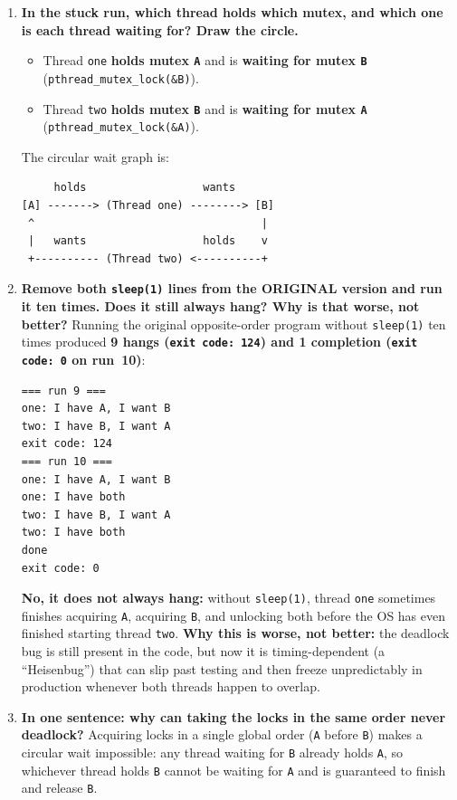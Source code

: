 \documentclass{../latex/utmreport}
\providecommand{\tightlist}{\setlength{\itemsep}{0pt}\setlength{\parskip}{0pt}}
\begin{document}
\begin{enumerate}
\tightlist
\item \textbf{In the stuck run, which thread holds which mutex, and which one is each thread waiting for? Draw the circle.}
\begin{itemize}
\tightlist
\item Thread \texttt{one} \textbf{holds mutex \texttt{A}} and is \textbf{waiting for mutex \texttt{B}} (\texttt{pthread\_mutex\_lock(\&B)}).
\item Thread \texttt{two} \textbf{holds mutex \texttt{B}} and is \textbf{waiting for mutex \texttt{A}} (\texttt{pthread\_mutex\_lock(\&A)}).
\end{itemize}
The circular wait graph is:
\begin{lstlisting}
     holds                  wants
[A] -------> (Thread one) --------> [B]
 ^                                   |
 |   wants                  holds    v
 +---------- (Thread two) <----------+
\end{lstlisting}

\item \textbf{Remove both \texttt{sleep(1)} lines from the ORIGINAL version and run it ten times. Does it still always hang? Why is that worse, not better?}
Running the original opposite-order program without \texttt{sleep(1)} ten times produced \textbf{9 hangs (\texttt{exit code: 124}) and 1 completion (\texttt{exit code: 0} on run~10)}:
\begin{lstlisting}
=== run 9 ===
one: I have A, I want B
two: I have B, I want A
exit code: 124
=== run 10 ===
one: I have A, I want B
one: I have both
two: I have B, I want A
two: I have both
done
exit code: 0
\end{lstlisting}
\textbf{No, it does not always hang:} without \texttt{sleep(1)}, thread \texttt{one} sometimes finishes acquiring \texttt{A}, acquiring \texttt{B}, and unlocking both before the OS has even finished starting thread \texttt{two}. \textbf{Why this is worse, not better:} the deadlock bug is still present in the code, but now it is timing-dependent (a ``Heisenbug'') that can slip past testing and then freeze unpredictably in production whenever both threads happen to overlap.

\item \textbf{In one sentence: why can taking the locks in the same order never deadlock?}
Acquiring locks in a single global order (\texttt{A} before \texttt{B}) makes a circular wait impossible: any thread waiting for \texttt{B} already holds \texttt{A}, so whichever thread holds \texttt{B} cannot be waiting for \texttt{A} and is guaranteed to finish and release \texttt{B}.
\end{enumerate}
\end{document}
